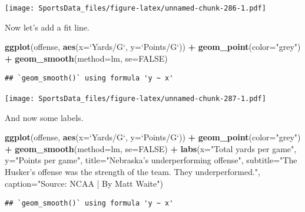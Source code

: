 \documentclass[
]{book}
\newenvironment{Shaded}{\begin{snugshade}}{\end{snugshade}}
\newcommand{\DataTypeTok}[1]{\textcolor[rgb]{0.13,0.29,0.53}{#1}}
\newcommand{\KeywordTok}[1]{\textcolor[rgb]{0.13,0.29,0.53}{\textbf{#1}}}
\newcommand{\NormalTok}[1]{#1}
\newcommand{\OperatorTok}[1]{\textcolor[rgb]{0.81,0.36,0.00}{\textbf{#1}}}
\newcommand{\OtherTok}[1]{\textcolor[rgb]{0.56,0.35,0.01}{#1}}
\newcommand{\StringTok}[1]{\textcolor[rgb]{0.31,0.60,0.02}{#1}}
\begin{document}
\texttt{[image: SportsData\_files/figure-latex/unnamed-chunk-286-1.pdf]}

Now let's add a fit line.

\begin{Shaded}
\begin{Highlighting}[]
\KeywordTok{ggplot}\NormalTok{(offense, }\KeywordTok{aes}\NormalTok{(}\DataTypeTok{x=}\StringTok{`}\DataTypeTok{Yards/G}\StringTok{`}\NormalTok{, }\DataTypeTok{y=}\StringTok{`}\DataTypeTok{Points/G}\StringTok{`}\NormalTok{)) }\OperatorTok{+}\StringTok{ }
\StringTok{  }\KeywordTok{geom_point}\NormalTok{(}\DataTypeTok{color=}\StringTok{"grey"}\NormalTok{) }\OperatorTok{+}\StringTok{ }\KeywordTok{geom_smooth}\NormalTok{(}\DataTypeTok{method=}\NormalTok{lm, }\DataTypeTok{se=}\OtherTok{FALSE}\NormalTok{)}
\end{Highlighting}
\end{Shaded}

\begin{verbatim}
## `geom_smooth()` using formula 'y ~ x'
\end{verbatim}

\texttt{[image: SportsData\_files/figure-latex/unnamed-chunk-287-1.pdf]}

And now some labels.

\begin{Shaded}
\begin{Highlighting}[]
\KeywordTok{ggplot}\NormalTok{(offense, }\KeywordTok{aes}\NormalTok{(}\DataTypeTok{x=}\StringTok{`}\DataTypeTok{Yards/G}\StringTok{`}\NormalTok{, }\DataTypeTok{y=}\StringTok{`}\DataTypeTok{Points/G}\StringTok{`}\NormalTok{)) }\OperatorTok{+}\StringTok{ }
\StringTok{  }\KeywordTok{geom_point}\NormalTok{(}\DataTypeTok{color=}\StringTok{"grey"}\NormalTok{) }\OperatorTok{+}\StringTok{ }\KeywordTok{geom_smooth}\NormalTok{(}\DataTypeTok{method=}\NormalTok{lm, }\DataTypeTok{se=}\OtherTok{FALSE}\NormalTok{) }\OperatorTok{+}\StringTok{ }
\StringTok{  }\KeywordTok{labs}\NormalTok{(}\DataTypeTok{x=}\StringTok{"Total yards per game"}\NormalTok{, }\DataTypeTok{y=}\StringTok{"Points per game"}\NormalTok{, }\DataTypeTok{title=}\StringTok{"Nebraska's underperforming offense"}\NormalTok{, }\DataTypeTok{subtitle=}\StringTok{"The Husker's offense was the strength of the team. They underperformed."}\NormalTok{, }\DataTypeTok{caption=}\StringTok{"Source: NCAA | By Matt Waite"}\NormalTok{)}
\end{Highlighting}
\end{Shaded}

\begin{verbatim}
## `geom_smooth()` using formula 'y ~ x'
\end{verbatim}
\end{document}
